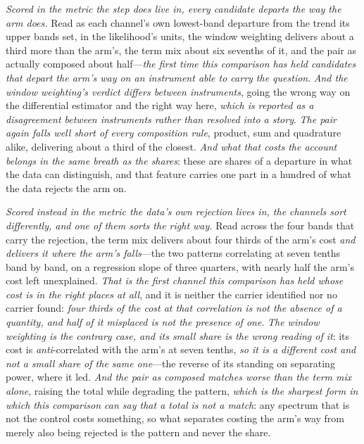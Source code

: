 \documentclass[11pt,a4paper]{article}
\theoremstyle{plain}
\theoremstyle{definition}
\theoremstyle{remark}
\begin{document}
\emph{Scored in the metric the step does live in, every candidate departs the way the arm does.} Read as each
channel's own lowest-band departure from the trend its upper bands set, in the likelihood's units, the window
weighting delivers about a third more than the arm's, the term mix about six sevenths of it, and the pair as
actually composed about half---\emph{the first time this comparison has held candidates that depart the arm's
way on an instrument able to carry the question}. \emph{And the window weighting's verdict differs between
instruments}, going the wrong way on the differential estimator and the right way here, \emph{which is reported
as a disagreement between instruments rather than resolved into a story}. \emph{The pair again falls well short
of every composition rule}, product, sum and quadrature alike, delivering about a third of the closest.
\emph{And what that costs the account belongs in the same breath as the shares}: these are shares of a
departure in what the data can distinguish, and that feature carries one part in a hundred of what the data
rejects the arm
on.

\emph{Scored instead in the metric the data's own rejection lives in, the channels sort differently, and one of
them sorts the right way.} Read across the four bands that carry the rejection, the term mix delivers about
four thirds of the arm's cost \emph{and delivers it where the arm's falls}---the two patterns correlating at
seven tenths band by band, on a regression slope of three quarters, with nearly half the arm's cost left
unexplained. \emph{That is the first channel this comparison has held whose cost is in the right places at
all}, and it is neither the carrier identified nor no carrier found: \emph{four thirds of the cost at that
correlation is not the absence of a quantity, and half of it misplaced is not the presence of one}.
\emph{The window weighting is the contrary case, and its small share is the wrong reading of it}: its cost is
\emph{anti}-correlated with the arm's at seven tenths, \emph{so it is a different cost and not a small share of
the same one}---the reverse of its standing on separating power, where it led. \emph{And the pair as composed
matches worse than the term mix alone}, raising the total while degrading the pattern, \emph{which is the
sharpest form in which this comparison can say that a total is not a match}: any spectrum that is not the
control costs something, so what separates costing the arm's way from merely also being rejected is the pattern
and never the share.
\end{document}
